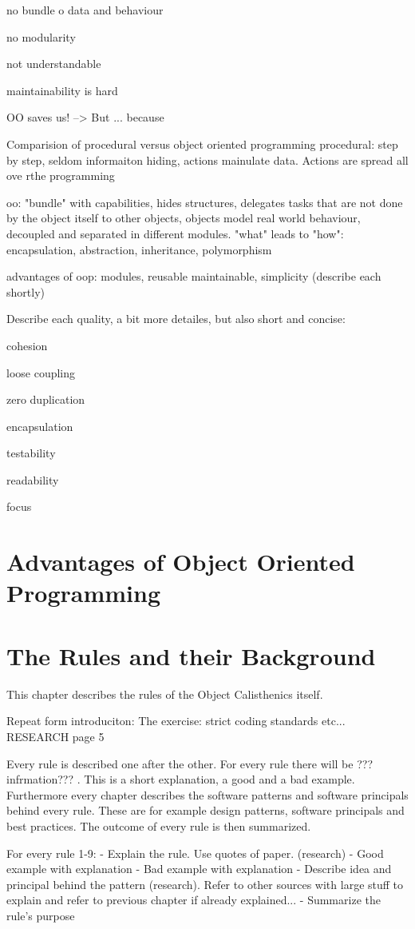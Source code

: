 no bundle o data and behaviour

no modularity

not understandable

maintainability is hard

OO saves us! --> But ... because

Comparision of procedural versus object oriented programming
procedural: step by step, seldom informaiton hiding, actions mainulate data. Actions are spread all ove rthe programming

oo: "bundle" with capabilities, hides structures, delegates tasks that are not done by the object itself to other objects, objects model real world behaviour, decoupled and separated in different modules. "what" leads to "how": encapsulation, abstraction, inheritance, polymorphism

advantages of oop: modules, reusable maintainable, simplicity (describe each shortly) 

Describe each quality, a bit more detailes, but also short and concise: 

cohesion

loose coupling

zero duplication

encapsulation

testability

readability

focus

\section{Advantages of Object Oriented Programming}

\section{The Rules and their Background}
This chapter describes the rules of the Object Calisthenics itself. 

Repeat form introduciton:
The exercise: strict coding standards etc... RESEARCH page 5

Every rule is described one after the other. For every rule there will be ??? infrmation??? . This is a short explanation, a good and a bad example. Furthermore every chapter describes the software patterns and software principals behind every rule. These are for example design patterns, software principals and best practices. The outcome of every rule is then summarized.

For every rule 1-9: 
 - Explain the rule. Use quotes of paper. (research)
 - Good example with explanation
 - Bad example with explanation
 - Describe idea and principal behind the pattern (research). Refer to other sources with large stuff to explain and refer to previous chapter if already explained...
 - Summarize the rule's purpose

